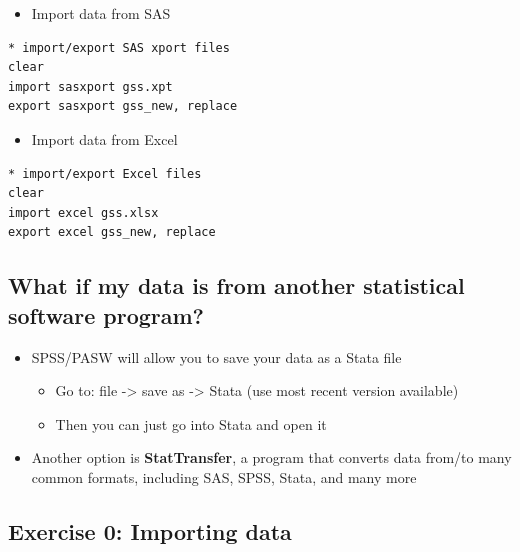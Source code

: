 \documentclass[]{book}
\providecommand{\tightlist}{%
  \setlength{\itemsep}{0pt}\setlength{\parskip}{0pt}}
\begin{document}
\begin{itemize}
\tightlist
\item
  Import data from SAS
\end{itemize}

\begin{verbatim}
* import/export SAS xport files
clear
import sasxport gss.xpt
export sasxport gss_new, replace
\end{verbatim}

\begin{itemize}
\tightlist
\item
  Import data from Excel
\end{itemize}

\begin{verbatim}
* import/export Excel files
clear
import excel gss.xlsx
export excel gss_new, replace
\end{verbatim}

\subsection{What if my data is from another statistical software
program?}\label{what-if-my-data-is-from-another-statistical-software-program}

\begin{itemize}
\tightlist
\item
  SPSS/PASW will allow you to save your data as a Stata file

  \begin{itemize}
  \tightlist
  \item
    Go to: file -\textgreater{} save as -\textgreater{} Stata (use most
    recent version available)
  \item
    Then you can just go into Stata and open it
  \end{itemize}
\item
  Another option is \textbf{StatTransfer}, a program that converts data
  from/to many common formats, including SAS, SPSS, Stata, and many more
\end{itemize}

\subsection{Exercise 0: Importing data}\label{exercise-0-importing-data}
\end{document}
